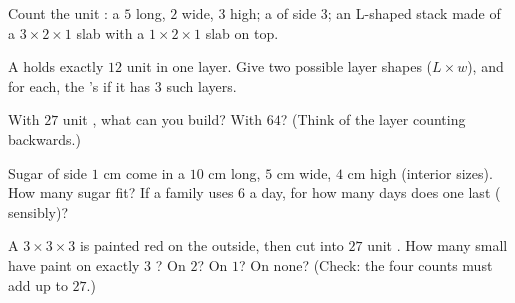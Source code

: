 \begin{exercise}[$\star$]\label{exo:g5:solids:6}
Count the unit : a  $5$ long, $2$ wide, $3$ high; a  of
side $3$; an L-shaped stack made of a $3 \times 2 \times 1$ slab
with a $1 \times 2 \times 1$ slab on top.
\end{exercise}

\begin{exercise}[$\star$]\label{exo:g5:solids:7}
A  holds exactly $12$ unit  in one layer. Give two possible
layer shapes ($L \times w$), and for each, the 's  if it
has $3$ such layers.
\end{exercise}

\begin{exercise}[$\star$]\label{exo:g5:solids:8}
With $27$ unit , what  can you build? With $64$? (Think of
the layer counting backwards.)
\end{exercise}

\begin{exercise}[$\star\star$]\label{exo:g5:solids:9}
Sugar  of side $1$ cm come in a  $10$ cm long, $5$ cm wide,
$4$ cm high (interior sizes). How many sugar  fit? If a
family uses $6$  a day, for how many days does one  last
( sensibly)?
\end{exercise}

\begin{exercise}[$\star\star$]\label{exo:g5:solids:10}
A $3 \times 3 \times 3$  is painted red on the outside, then cut
into $27$ unit . How many small  have paint on exactly
$3$ ? On $2$? On $1$? On none? (Check: the four counts must add
up to $27$.)
\end{exercise}
